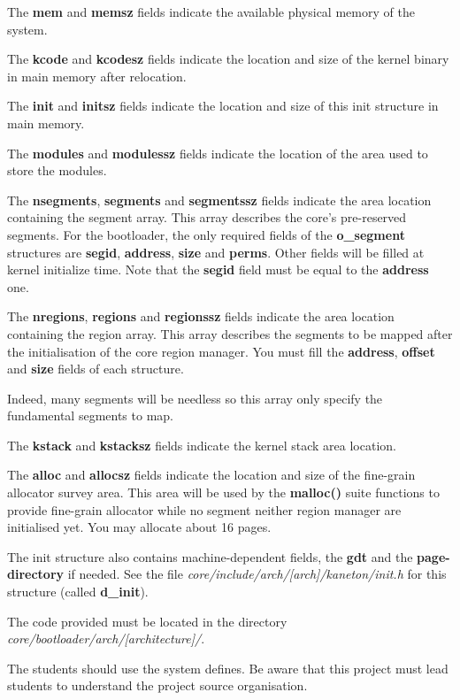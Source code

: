 The \textbf{mem} and \textbf{memsz} fields indicate the available physical
memory of the system.

The \textbf{kcode} and \textbf{kcodesz} fields indicate the location and
size of the kernel binary in main memory after relocation.

The \textbf{init} and \textbf{initsz} fields indicate the location and
size of this init structure in main memory.

The \textbf{modules} and \textbf{modulessz} fields indicate the
location of the area used to store the modules.

The  \textbf{nsegments},   \textbf{segments}  and  \textbf{segmentssz}
fields indicate  the area location containing the  segment array. This
array describes the core's  pre-reserved segments. For the bootloader,
the  only required  fields of  the \textbf{o\_segment}  structures are
\textbf{segid}, \textbf{address}, \textbf{size} and  \textbf{perms}.
Other fields will be filled at kernel initialize time. Note that the
\textbf{segid} field must be equal to the \textbf{address} one.

The \textbf{nregions},  \textbf{regions} and \textbf{regionssz} fields
indicate  the area location  containing the  region array.  This array
describes the  segments to be  mapped after the initialisation  of the
core   region   manager.   You   must   fill   the   \textbf{address},
\textbf{offset} and \textbf{size} fields of each structure.

Indeed, many segments will be needless so this array only specify the
fundamental segments to map.

The \textbf{kstack} and \textbf{kstacksz} fields indicate the kernel
stack area location.

The \textbf{alloc}  and \textbf{allocsz} fields  indicate the location
and size  of the fine-grain allocator  survey area. This  area will be
used by  the \textbf{malloc()}  suite functions to  provide fine-grain
allocator  while no  segment  neither region  manager are  initialised
yet. You may allocate about 16 pages.

The  init  structure   also  contains  machine-dependent  fields,  the
\textbf{gdt} and the \textbf{page-directory}  if needed.  See the file
\textit{core/include/arch/[arch]/kaneton/init.h}  for  this  structure
(called \textbf{d\_init}).

The code provided must be located in the directory
\textit{core/bootloader/arch/[architecture]/}.

The students should use the system defines. Be aware that this project
must lead students to understand the project source organisation.

